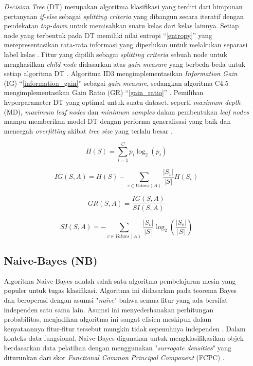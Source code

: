\documentclass[conference]{IEEEtran}
\begin{document}
\textit{Decision Tree} (DT) merupakan algoritma klasifikasi yang terdiri dari himpunan pertanyaan \textit{if-else} sebagai \textit{splitting criteria} yang dibangun secara iteratif 
dengan pendekatan \textit{top-down} untuk memisahkan suatu kelas dari kelas lainnya. Setiap node yang terbentuk pada DT memiliki nilai entropi ``\eqref{entropy}'' yang merepresentasikan 
rata-rata informasi yang diperlukan untuk melakukan separasi label kelas \cite{b15}. Fitur yang dipilih sebagai \textit{splitting criteria} sebuah node untuk menghasilkan \textit{child node} 
didasarkan atas \textit{gain measure} yang berbeda-beda untuk setiap algoritma DT \cite{b4}. Algoritma ID3 mengimplementasikan \textit{Information Gain} (IG) ``\eqref{information_gain}'' sebagai \textit{gain measure}, sedangkan algoritma C4.5 
mengimplementasikan Gain Ratio (GR) ``\eqref{gain_ratio}'' \cite{b16}. Pemilihan hyperparameter DT yang optimal untuk suatu dataset, seperti \textit{maximum depth} (MD), \textit{maximum leaf nodes} dan \textit{minimum samples} 
dalam pembentukan \textit{leaf nodes} mampu memberikan model DT dengan performa generalisasi yang baik dan mencegah \textit{overfitting} akibat \textit{tree size} yang terlalu besar \cite{b17}.

\begin{equation}
    H(S) = \sum_{i=1}^{C} p_i \log_2(p_i) \label{entropy}
\end{equation}

\begin{equation}
    IG(S, A) = H(S) - \sum_{v \in Values(A)} \frac{|S_v|}{|S|} H(S_v) \label{information_gain}
\end{equation}

\begin{equation}
    GR(S, A) = \frac{IG(S,A)}{SI(S, A)} \label{gain_ratio}
\end{equation}

\begin{equation}
    SI(S, A) = -\sum_{v \in Values(A)} \frac{|S_v|} {|S|} \log_2(\frac{|S_v|} {|S|}) \label{split_info}
\end{equation}

\subsection{Naive-Bayes (NB)}

Algoritma Naive-Bayes adalah salah satu algoritma pembelajaran mesin yang populer untuk tugas klasifikasi. Algoritma ini didasarkan pada teorema Bayes dan beroperasi dengan asumsi "\textit{naive}" 
bahwa semua fitur yang ada bersifat independen satu sama lain. Asumsi ini menyederhanakan perhitungan probabilitas, menjadikan algoritma ini sangat efisien meskipun dalam kenyataannya 
fitur-fitur tersebut mungkin tidak sepenuhnya independen \cite{b19}. Dalam konteks data fungsional, Naive-Bayes digunakan untuk mengklasifikasikan objek berdasarkan data pelatihan dengan 
menggunakan "\textit{surrogate densities}" yang diturunkan dari skor \textit{Functional Common Principal Component} (FCPC) \cite{b18}.
\end{document}
